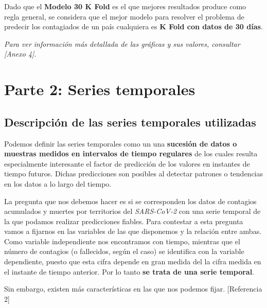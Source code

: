 \documentclass[12pt,a4paper, xcolor=table]{article}
\begin{document}
    \vspace{2mm}

    Dado que el \textbf{Modelo 30 K Fold} es el que mejores resultados produce como regla general, se considera que el mejor modelo para resolver el problema de predecir los contagiados de un país cualquiera es \textbf{K Fold con datos de 30 días}.

    \vspace{6mm}

    \textit{Para ver información más detallada de las gráficas y sus valores, consultar [Anexo 4]}.



    \newpage
    \section{Parte 2: Series temporales}

    \subsection{Descripción de las series temporales utilizadas}

        Podemos definir las series temporales como un una \textbf{sucesión de datos o muestras medidos en intervalos de tiempo regulares} de los cuales resulta especialmente interesante el factor de predicción de los valores en instantes de tiempo futuros. Dichas predicciones son posibles al detectar patrones o tendencias en los datos a lo largo del tiempo.

        \vspace{2mm}

        La pregunta que nos debemos hacer es si se corresponden los datos de contagios acumulados y muertes por territorios del  \textit{SARS-CoV-2} con una serie temporal de la que podamos realizar predicciones fiables. Para contestar a esta pregunta vamos a fijarnos en las variables de las que disponemos y la relación entre ambas. Como variable independiente nos encontramos con tiempo, mientras que el número de contagios (o fallecidos, según el caso) se identifica con la variable dependiente, puesto que esta cifra depende en gran medida del la cifra medida en el instante de tiempo anterior. Por lo tanto \textbf{se trata de una serie temporal}.

        \vspace{2mm}

        Sin embargo, existen más características en las que nos podemos fijar. [Referencia 2]
        
\end{document}
